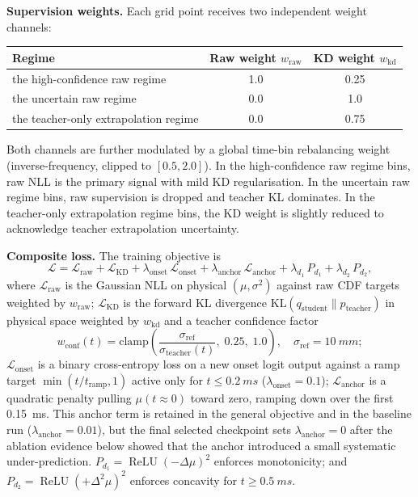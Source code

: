 \documentclass[english, 12pt, a4paper, elec, utf8, a-2b, online]{aaltothesis}
\begin{document}
\textbf{Supervision weights.}  Each grid point receives two independent weight channels:

\begin{center}
\begin{tabular}{lcc}
\toprule
Regime & Raw weight $w_{\mathrm{raw}}$ & KD weight $w_{\mathrm{kd}}$ \\
\midrule
the high-confidence raw regime  & 1.0 & 0.25 \\
the uncertain raw regime & 0.0 & 1.0  \\
the teacher-only extrapolation regime  & 0.0 & 0.75 \\
\bottomrule
\end{tabular}
\end{center}

Both channels are further modulated by a global time-bin rebalancing weight (inverse-frequency, clipped to $[0.5,2.0]$). In the high-confidence raw regime bins, raw NLL is the primary signal with mild KD regularisation. In the uncertain raw regime bins, raw supervision is dropped and teacher KL dominates. In the teacher-only extrapolation regime bins, the KD weight is slightly reduced to acknowledge teacher extrapolation uncertainty.

\textbf{Composite loss.}  The training objective is
\[
\mathcal{L} = \mathcal{L}_{\mathrm{raw}} + \mathcal{L}_{\mathrm{KD}} + \lambda_{\mathrm{onset}}\,\mathcal{L}_{\mathrm{onset}} + \lambda_{\mathrm{anchor}}\,\mathcal{L}_{\mathrm{anchor}} + \lambda_{d_1}\,P_{d_1} + \lambda_{d_2}\,P_{d_2},
\]
where $\mathcal{L}_{\mathrm{raw}}$ is the Gaussian NLL on physical $(\mu,\sigma^2)$ against raw CDF targets weighted by $w_{\mathrm{raw}}$; $\mathcal{L}_{\mathrm{KD}}$ is the forward KL divergence $\mathrm{KL}(q_{\mathrm{student}}\|p_{\mathrm{teacher}})$ in physical space weighted by $w_{\mathrm{kd}}$ and a teacher confidence factor
\[
w_{\mathrm{conf}}(t) = \mathrm{clamp}\!\left(\frac{\sigma_{\mathrm{ref}}}{\sigma_{\mathrm{teacher}}(t)},\;0.25,\;1.0\right),\quad\sigma_{\mathrm{ref}}=\SI{10}{mm};
\]
$\mathcal{L}_{\mathrm{onset}}$ is a binary cross-entropy loss on a new onset logit output against a ramp target $\min(t/t_{\mathrm{ramp}},1)$ active only for $t\leq\SI{0.2}{ms}$ ($\lambda_{\mathrm{onset}}=0.1$); $\mathcal{L}_{\mathrm{anchor}}$ is a quadratic penalty pulling $\mu(t\approx0)$ toward zero, ramping down over the first \SI{0.15}{ms}. This anchor term is retained in the general objective and in the baseline run ($\lambda_{\mathrm{anchor}}=0.01$), but the final selected checkpoint sets $\lambda_{\mathrm{anchor}}=0$ after the ablation evidence below showed that the anchor introduced a small systematic under-prediction. $P_{d_1}=\operatorname{ReLU}(-\Delta\mu)^2$ enforces monotonicity; and $P_{d_2}=\operatorname{ReLU}(+\Delta^2\mu)^2$ enforces concavity for $t\geq\SI{0.5}{ms}$.
\end{document}
